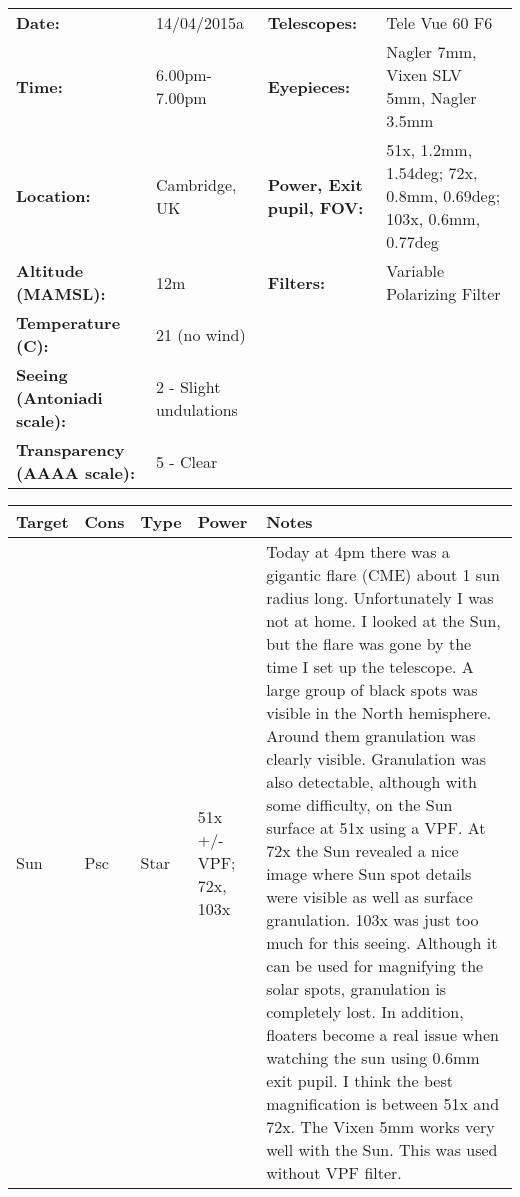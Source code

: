 \begin{tabular}{ p{1.7in} p{1.2in} p{1.5in} p{4.2in}}
{\bf Date:} & 14/04/2015a & {\bf Telescopes:} & Tele Vue 60 F6 \\ 
{\bf Time:} & 6.00pm-7.00pm & {\bf Eyepieces:} & Nagler 7mm, Vixen SLV 5mm, Nagler 3.5mm \\ 
{\bf Location:} & Cambridge, UK & {\bf Power, Exit pupil, FOV:} & 51x, 1.2mm, 1.54deg; 72x, 0.8mm, 0.69deg; 103x, 0.6mm, 0.77deg \\ 
{\bf Altitude (MAMSL):} & 12m & {\bf Filters:} & Variable Polarizing Filter \\ 
{\bf Temperature (C):} & 21 (no wind) & & \\ 
{\bf Seeing (Antoniadi scale):} & 2 - Slight undulations & & \\ 
{\bf Transparency (AAAA scale):} & 5 - Clear & & \\ 
\end{tabular}
\centering 
\begin{longtable}{ p{0.8in}  p{0.3in}  p{0.5in}  p{0.9in}  p{5.8in} }
\hline 
{\bf Target} & {\bf Cons} & {\bf Type} & {\bf Power} & {\bf Notes} \\ 
\hline 
Sun & Psc & Star & 51x +/- VPF; 72x, 103x & Today at 4pm there was a gigantic flare (CME) about 1 sun radius long. Unfortunately I was not at home. I looked at the Sun, but the flare was gone by the time I set up the telescope. A large group of black spots was visible in the North hemisphere. Around them granulation was clearly visible. Granulation was also detectable, although with some difficulty, on the Sun surface at 51x using a VPF. At 72x the Sun revealed a nice image where Sun spot details were visible as well as surface granulation. 103x was just too much for this seeing. Although it can be used for magnifying the solar spots, granulation is completely lost. In addition, floaters become a real issue when watching the sun using 0.6mm exit pupil. I think the best magnification is between 51x and 72x. The Vixen 5mm works very well with the Sun. This was used without VPF filter. \\ 
\hline 
\end{longtable} 

